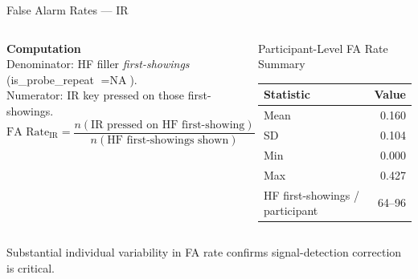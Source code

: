 \documentclass[aspectratio=169, 10pt]{beamer}
\begin{document}
\begin{frame}{False Alarm Rates — IR}
  \begin{columns}[T]
      \textbf{Computation}\\[4pt]
      \small Denominator: HF filler \emph{first-showings}
      (is\_probe\_repeat $= \text{NA}$).\\
      Numerator: IR key pressed on those first-showings.\\[6pt]
      \[
        \text{FA Rate}_\text{IR} =
          \frac{n(\text{IR pressed on HF first-showing})}
               {n(\text{HF first-showings shown})}
      \]

      \begin{block}{Participant-Level FA Rate Summary}
        \begin{tabular}{lr}
          \toprule
          Statistic & Value \\
          \midrule
          Mean  & 0.160 \\
          SD    & 0.104 \\
          Min   & 0.000 \\
          Max   & 0.427 \\
          \midrule
          HF first-showings / participant & 64–96 \\
          \bottomrule
        \end{tabular}
      \end{block}
  \end{columns}
  \vspace{0.4em}
  \small Substantial individual variability in FA rate confirms
  signal-detection correction is critical.
\end{frame}
\end{document}
